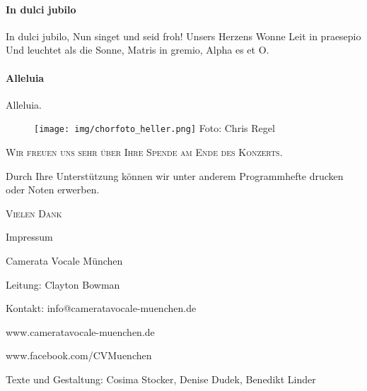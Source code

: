 \documentclass[11pt, ngermanm, titlepage]{article}
\begin{document}
\begin{multicols}{2}
	\paragraph{In dulci jubilo\newline}
	In dulci jubilo,\newline
	Nun singet und seid froh!\newline
	Unsers Herzens Wonne\newline 
	Leit in praesepio\newline
	Und leuchtet als die Sonne,\newline
	Matris in gremio,\newline
	Alpha es et O.
	
	\paragraph{Alleluia\newline}
	Alleluia.
		
	\end{multicols}
	
	\pagebreak
	\centering
	\begin{figure}
		\texttt{[image: img/chorfoto\_heller.png]}
		\tiny{Foto: Chris Regel}
	\end{figure}
	\par\vspace{2cm}
	
	{\scshape\large Wir freuen uns sehr über Ihre Spende am Ende des Konzerts.\par
	Durch Ihre Unterstützung können wir unter anderem Programmhefte drucken oder Noten erwerben.\par}
	\vspace{1.5cm}
	{\scshape\Large Vielen Dank\par}
	\vfill
	{\small Impressum\par
		{\large Camerata Vocale München\par}
	Leitung: Clayton Bowman\par
	Kontakt: info@cameratavocale-muenchen.de\par
	www.cameratavocale-muenchen.de\par
	www.facebook.com/CVMuenchen\par
	Texte und Gestaltung: Cosima Stocker, Denise Dudek, Benedikt Linder}
	
\end{document}
